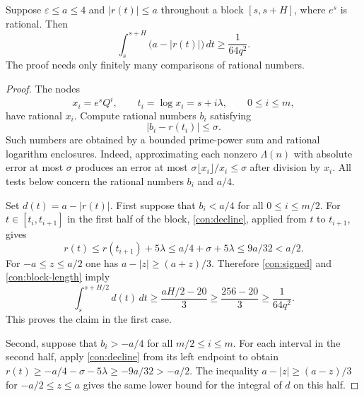 \begin{lemma}\label{con:deficit}
Suppose $\varepsilon\leq a\leq4$ and $|r(t)|\leq a$ throughout a
block $[s,s+H]$, where $e^s$ is rational.  Then
\begin{equation}
 \int_s^{s+H}\bigl(a-|r(t)|\bigr)\,dt
       \geq\frac1{64q^2}.
 \label{con:deficit-bound}
\end{equation}
The proof needs only finitely many comparisons of rational numbers.
\end{lemma}

\begin{proof}
The nodes
\[
 x_i=e^sQ^i,\qquad t_i=\log x_i=s+i\lambda,
       \qquad 0\leq i\leq m,
\]
have rational $x_i$.  Compute rational numbers $b_i$ satisfying
\begin{equation}
 |b_i-r(t_i)|\leq\sigma.\label{con:sample-error}
\end{equation}
Such numbers are obtained by a bounded prime-power sum and rational
logarithm enclosures.  Indeed, approximating each nonzero $\Lambda(n)$
with absolute error at most $\sigma$ produces an error at most
$\sigma\lfloor x_i\rfloor/x_i\leq\sigma$ after division by $x_i$.
All tests below concern the rational numbers $b_i$ and $a/4$.

Set $d(t)=a-|r(t)|$.  First suppose that
$b_i<a/4$ for all $0\leq i\leq m/2$.
For $t\in[t_i,t_{i+1}]$ in the first half of the block,
\eqref{con:decline}, applied from $t$ to $t_{i+1}$, gives
\[
 r(t)\leq r(t_{i+1})+5\lambda
       \leq a/4+\sigma+5\lambda
       \leq 9a/32<a/2.
\]
For $-a\leq z\leq a/2$ one has
$a-|z|\geq(a+z)/3$.  Therefore \eqref{con:signed} and
\eqref{con:block-length} imply
\[
 \int_s^{s+H/2}d(t)\,dt
 \geq\frac{aH/2-20}{3}
 \geq\frac{256-20}{3}
 \geq\frac1{64q^2}.
\]
This proves the claim in the first case.

Second, suppose that $b_i>-a/4$ for all $m/2\leq i\leq m$.
For each interval in the second half, apply \eqref{con:decline}
from its left endpoint to obtain
$r(t)\geq-a/4-\sigma-5\lambda\geq-9a/32>-a/2$.
The inequality $a-|z|\geq(a-z)/3$ for $-a/2\leq z\leq a$
gives the same lower bound for the integral of $d$ on this half.


\end{proof}
